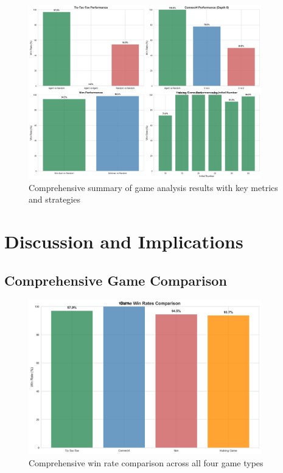 \documentclass[12pt]{article}
\begin{document}
\begin{figure}[H]
\centering
\includegraphics[width=0.9\textwidth]{output/images/comprehensive_summary.png}
\caption{Comprehensive summary of game analysis results with key metrics and strategies}
\label{fig:comprehensive_summary}
\end{figure}

\section{Discussion and Implications}

\subsection{Comprehensive Game Comparison}

\begin{figure}[H]
\centering
\includegraphics[width=0.9\textwidth]{output/images/game_win_rates_comparison.png}
\caption{Comprehensive win rate comparison across all four game types}
\label{fig:game_comparison}
\end{figure}
\end{document}
